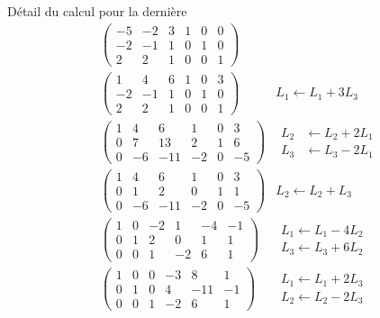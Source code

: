Détail du calcul pour la dernière
\begin{align*}
  &\begin{pmatrix}
 -5 & -2 & 3 & 1 & 0 & 0\\
 -2 & -1 & 1 & 0 & 1 & 0\\
  2 & 2  & 1 & 0 & 0 & 1
\end{pmatrix}& \\
  &\begin{pmatrix}
  1 & 4  & 6 & 1 & 0 & 3\\
 -2 & -1 & 1 & 0 & 1 & 0\\
  2 & 2  & 1 & 0 & 0 & 1
\end{pmatrix}& L_1 \leftarrow L_1 + 3L_3\\
  &\begin{pmatrix}
  1 & 4  & 6   & 1  & 0 & 3 \\
  0 & 7  & 13  & 2  & 1 & 6 \\
  0 & -6 & -11 & -2 & 0 & -5
\end{pmatrix}& 
\begin{aligned}
  L_2 &\leftarrow L_2 + 2L_1\\
  L_3 &\leftarrow L_3 - 2L_1
\end{aligned} \\
  &\begin{pmatrix}
  1 & 4  & 6   & 1  & 0 & 3 \\
  0 & 1  & 2   & 0  & 1 & 1 \\
  0 & -6 & -11 & -2 & 0 & -5
\end{pmatrix}& L_2 \leftarrow L_2 + L_3 \\
  &\begin{pmatrix}
  1 & 0 & -2  & 1  & -4 & -1 \\
  0 & 1 & 2  & 0   & 1  & 1 \\
  0 & 0 & 1  & -2  & 6  & 1
\end{pmatrix}& 
\begin{aligned}
  L_1 \leftarrow L_1 - 4L_2 \\
  L_3 \leftarrow L_3 + 6L_2
\end{aligned} \\
  &\begin{pmatrix}
  1 & 0 & 0 & -3 & 8   & 1 \\
  0 & 1 & 0 & 4  & -11 & -1 \\
  0 & 0 & 1 & -2  & 6  & 1
\end{pmatrix}& 
  \begin{aligned}
  L_1 \leftarrow L_1 + 2L_3\\
  L_2 \leftarrow L_2 - 2L_3
  \end{aligned}
\end{align*}
